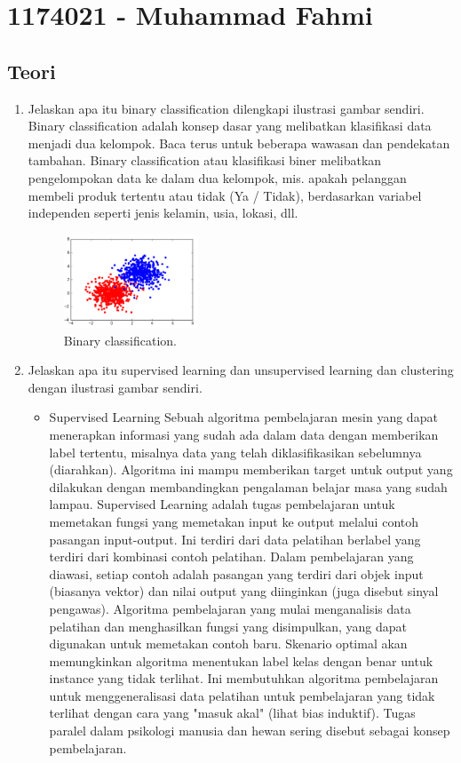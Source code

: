 \section{1174021 - Muhammad Fahmi}
\subsection{Teori}
\begin{enumerate}

	\item Jelaskan apa itu binary classification dilengkapi ilustrasi gambar sendiri.
	\hfill\break
	Binary classification adalah konsep dasar yang melibatkan klasifikasi data menjadi dua kelompok. Baca terus untuk beberapa wawasan dan pendekatan tambahan. Binary classification atau klasifikasi biner melibatkan pengelompokan data ke dalam dua kelompok, mis. apakah pelanggan membeli produk tertentu atau tidak (Ya / Tidak), berdasarkan variabel independen seperti jenis kelamin, usia, lokasi, dll.

	\begin{figure}[H]
	\centering
		\includegraphics[width=4cm]{figures/1174021/tugas2/materi/1.png}
		\caption{Binary classification.}
	\end{figure}

	\item Jelaskan apa itu supervised learning dan unsupervised learning dan clustering dengan ilustrasi gambar sendiri.
	\hfill\break

	\begin{itemize}
		\item Supervised Learning
		\hfill\break
		Sebuah algoritma pembelajaran mesin yang dapat menerapkan informasi yang sudah ada dalam data dengan memberikan label tertentu, misalnya data yang telah diklasifikasikan sebelumnya (diarahkan). Algoritma ini mampu memberikan target untuk output yang dilakukan dengan membandingkan pengalaman belajar masa yang sudah lampau. Supervised Learning adalah tugas pembelajaran untuk memetakan fungsi yang memetakan input ke output melalui contoh pasangan input-output. Ini terdiri dari data pelatihan berlabel yang terdiri dari kombinasi contoh pelatihan. Dalam pembelajaran yang diawasi, setiap contoh adalah pasangan yang terdiri dari objek input (biasanya vektor) dan nilai output yang diinginkan (juga disebut sinyal pengawas). Algoritma pembelajaran yang mulai menganalisis data pelatihan dan menghasilkan fungsi yang disimpulkan, yang dapat digunakan untuk memetakan contoh baru. Skenario optimal akan memungkinkan algoritma menentukan label kelas dengan benar untuk instance yang tidak terlihat. Ini membutuhkan algoritma pembelajaran untuk menggeneralisasi data pelatihan untuk pembelajaran yang tidak terlihat dengan cara yang "masuk akal" (lihat bias induktif). Tugas paralel dalam psikologi manusia dan hewan sering disebut sebagai konsep pembelajaran.


\end{itemize}
\end{enumerate}
